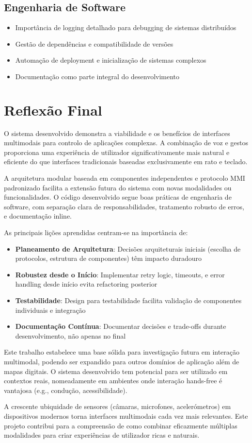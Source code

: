 \subsection{Engenharia de Software}

\begin{itemize}
    \item Importância de logging detalhado para debugging de sistemas distribuídos
    \item Gestão de dependências e compatibilidade de versões
    \item Automação de deployment e inicialização de sistemas complexos
    \item Documentação como parte integral do desenvolvimento
\end{itemize}

\section{Reflexão Final}

O sistema desenvolvido demonstra a viabilidade e os benefícios de interfaces multimodais para controlo de aplicações complexas. A combinação de voz e gestos proporciona uma experiência de utilizador significativamente mais natural e eficiente do que interfaces tradicionais baseadas exclusivamente em rato e teclado.

A arquitetura modular baseada em componentes independentes e protocolo MMI padronizado facilita a extensão futura do sistema com novas modalidades ou funcionalidades. O código desenvolvido segue boas práticas de engenharia de software, com separação clara de responsabilidades, tratamento robusto de erros, e documentação inline.

As principais lições aprendidas centram-se na importância de:
\begin{itemize}
    \item \textbf{Planeamento de Arquitetura}: Decisões arquiteturais iniciais (escolha de protocolos, estrutura de componentes) têm impacto duradouro
    \item \textbf{Robustez desde o Início}: Implementar retry logic, timeouts, e error handling desde início evita refactoring posterior
    \item \textbf{Testabilidade}: Design para testabilidade facilita validação de componentes individuais e integração
    \item \textbf{Documentação Contínua}: Documentar decisões e trade-offs durante desenvolvimento, não apenas no final
\end{itemize}

Este trabalho estabelece uma base sólida para investigação futura em interação multimodal, podendo ser expandido para outros domínios de aplicação além de mapas digitais. O sistema desenvolvido tem potencial para ser utilizado em contextos reais, nomeadamente em ambientes onde interação hands-free é vantajosa (e.g., condução, acessibilidade).

A crescente ubiquidade de sensores (câmaras, microfones, acelerómetros) em dispositivos modernos torna interfaces multimodais cada vez mais relevantes. Este projeto contribui para a compreensão de como combinar eficazmente múltiplas modalidades para criar experiências de utilizador ricas e naturais.
